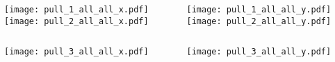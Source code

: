 \documentclass{beamer}
\begin{document}
\begin{frame}
\begin{columns}
\begin{column}{0.45\textwidth}
\texttt{[image: pull\_1\_all\_all\_x.pdf]} \\ \vfill
\texttt{[image: pull\_2\_all\_all\_x.pdf]}
\end{column}
\begin{column}{0.45\textwidth}
\texttt{[image: pull\_1\_all\_all\_y.pdf]} \\ \vfill
\texttt{[image: pull\_2\_all\_all\_y.pdf]}
\end{column}
\end{columns}
\end{frame}
\begin{frame}
\begin{columns}
\begin{column}{0.45\textwidth}
\texttt{[image: pull\_3\_all\_all\_x.pdf]} \\ \vfill
\end{column}
\begin{column}{0.45\textwidth}
\texttt{[image: pull\_3\_all\_all\_y.pdf]} \\ \vfill
\end{column}
\end{columns}
\end{frame}
\end{document}
